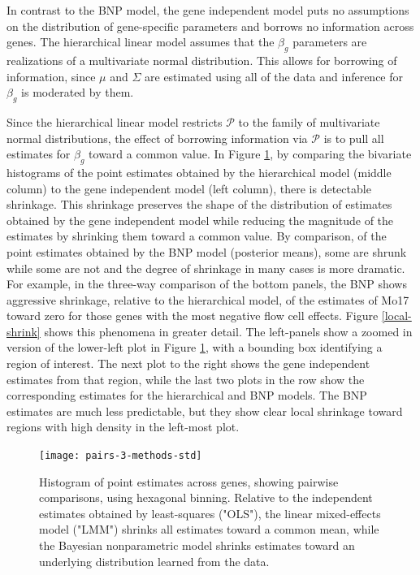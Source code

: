 {In contrast to the BNP model, the gene independent model puts no assumptions on the distribution of gene-specific parameters and borrows no information across genes. The hierarchical linear model assumes that the $\beta_g$ parameters are realizations of a multivariate normal distribution. This allows for borrowing of information, since $\mu$ and $\Sigma$ are estimated using all of the data and inference for $\beta_g$ is moderated by them.

Since the hierarchical linear model restricts $\mathcal{P}$ to the family of multivariate normal distributions, the effect of borrowing information via $\mathcal{P}$ is to pull all estimates for $\beta_g$ toward a common value. In Figure \ref{pairs-3-methods}, by comparing the bivariate histograms of the point estimates obtained by the hierarchical model (middle column) to the gene independent model (left column), there is detectable shrinkage. This shrinkage preserves the shape of the distribution of estimates obtained by the gene independent model while reducing the magnitude of the estimates by shrinking them toward a common value. By comparison, of the point estimates obtained by the BNP model (posterior means), some are shrunk while some are not and the degree of shrinkage in many cases is more dramatic. For example, in the three-way comparison of the bottom panels, the BNP shows aggressive shrinkage, relative to the hierarchical model, of the estimates of Mo17 toward zero for those genes with the most negative flow cell effects. Figure \ref{local-shrink} shows this phenomena in greater detail. The left-panels show a zoomed in version of the lower-left plot in Figure \ref{pairs-3-methods}, with a bounding box identifying a region of interest. The next plot to the right shows the gene independent estimates from that region, while the last two plots in the row show the corresponding estimates for the hierarchical and BNP models. The BNP estimates are much less predictable, but they show clear local shrinkage toward regions with high density in the left-most plot. %

\begin{figure}[ht]
\centering
\texttt{[image: pairs-3-methods-std]}
\caption{Histogram of point estimates across genes, showing pairwise comparisons, using hexagonal binning. Relative to the independent estimates obtained by least-squares ("OLS"), the linear mixed-effects model ("LMM") shrinks all estimates toward a common mean, while the Bayesian nonparametric model shrinks estimates toward an underlying distribution learned from the data.}
\label{pairs-3-methods}
\end{figure}

}
